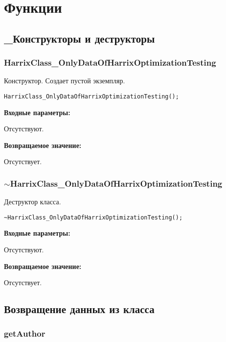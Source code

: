 \documentclass[a4paper,12pt]{article}
\begin{document}
\newpage
\section{Функции}
\subsection{\_Конструкторы и деструкторы}

\subsubsection{HarrixClass\_OnlyDataOfHarrixOptimizationTesting}\label{HarrixClass_OnlyDataOfHarrixOptimizationTesting}

Конструктор. Создает пустой экземпляр.


\begin{lstlisting}[label=code_syntax_HarrixClass_OnlyDataOfHarrixOptimizationTesting,caption=Синтаксис]
HarrixClass_OnlyDataOfHarrixOptimizationTesting();
\end{lstlisting}

\textbf{Входные параметры:}

Отсутствуют.

\textbf{Возвращаемое значение:}

Отсутствует.


\subsubsection{$\sim$HarrixClass\_OnlyDataOfHarrixOptimizationTesting}\label{tildaHarrixClass_OnlyDataOfHarrixOptimizationTesting}

Деструктор класса.


\begin{lstlisting}[label=code_syntax_tildaHarrixClass_OnlyDataOfHarrixOptimizationTesting,caption=Синтаксис]
~HarrixClass_OnlyDataOfHarrixOptimizationTesting();
\end{lstlisting}

\textbf{Входные параметры:}

Отсутствуют.

\textbf{Возвращаемое значение:}

Отсутствует.


\subsection{Возвращение данных из класса}

\subsubsection{getAuthor}\label{getAuthor}
\end{document}
